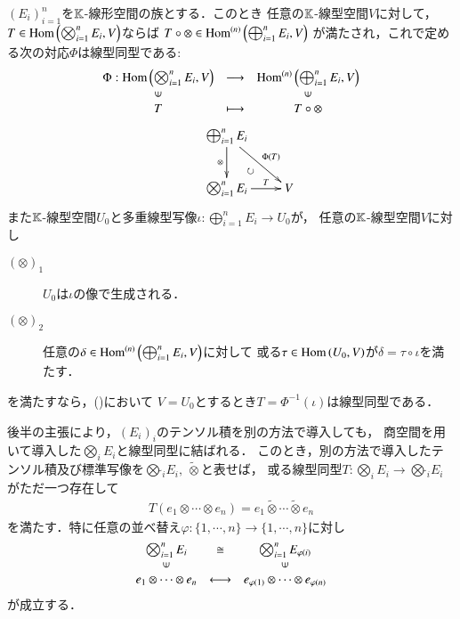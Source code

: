	\begin{screen}
		\begin{thm}
		\label{thm:universality_of_tensor_product}
			$(E_i)_{i=1}^n$を$\K$-線形空間の族とする．このとき
			任意の$\K$-線型空間$V$に対して，$T \in \Hom{\bigotimes_{i=1}^n E_i}{V}$ならば
			$T \circ \otimes \in \Ln{\bigoplus_{i=1}^n E_i}{V}{n}$
			が満たされ，これで定める次の対応$\Phi$は線型同型である:
			\begin{align}
				\begin{array}{ccc}
					\Phi:\Hom{\bigotimes_{i=1}^n E_i}{V} & \longrightarrow & \Ln{\bigoplus_{i=1}^n E_i}{V}{n} \\
					\rotatebox{90}{$\in$} & & \rotatebox{90}{$\in$} \\
					T & \longmapsto & T \circ \otimes 
					\label{eq:thm_universality_of_tensor_product}
				\end{array}
			\end{align}
			\begin{align}
				\xymatrix{
					&\bigoplus_{i=1}^n E_i \ar[d]_-\otimes \ar[rd]^-{\Phi(T)} & \\
					&\bigotimes_{i=1}^n E_i \ar[r]^-T & V \ar@{}[lu]<2ex>|\circlearrowright
				}
			\end{align}
			また$\K$-線型空間$U_0$と多重線型写像$\iota:\bigoplus_{i=1}^n E_i \longrightarrow U_0$が，
			任意の$\K$-線型空間$V$に対し
			\begin{description}
				\item[$(\otimes)_1$] $U_0$は$\iota$の像で生成される．
				\item[$(\otimes)_2$] 任意の$\delta \in \Ln{\bigoplus_{i=1}^n E_i}{V}{n}$に対して
					或る$\tau \in \Hom{U_0}{V}$が$\delta = \tau \circ \iota$を満たす．
			\end{description}
			を満たすなら，()において
			$V = U_0$とするとき$T = \Phi^{-1}(\iota)$は線型同型である．
		\end{thm}
	\end{screen}
	後半の主張により，$(E_i)_i$のテンソル積を別の方法で導入しても，
	商空間を用いて導入した$\bigotimes_i E_i$と線型同型に結ばれる．
	このとき，別の方法で導入したテンソル積及び標準写像を$\bigotimes\tilde{ }_i E_i,\ \tilde{\otimes}$と表せば，
	或る線型同型$T:\bigotimes_i E_i \longrightarrow \bigotimes\tilde{ }_i E_i$がただ一つ存在して
	\begin{align}
		T(e_1 \otimes \cdots \otimes e_n) = e_1 \tilde{\otimes} \cdots \tilde{\otimes} e_n 
	\end{align}
	を満たす．特に任意の並べ替え$\varphi:\{1,\cdots,n\} \longrightarrow \{1,\cdots,n\}$に対し
	\begin{align}
		\begin{array}{ccc}
		\bigotimes_{i=1}^{n} E_i & \cong & \bigotimes_{i=1}^{n} E_{\varphi(i)} \\
		\rotatebox{90}{$\in$} & & \rotatebox{90}{$\in$} \\
		e_1 \otimes \cdots \otimes e_n & \longleftrightarrow & e_{\varphi(1)} \otimes \cdots \otimes e_{\varphi(n)}
		\end{array}
	\end{align}
	が成立する．
	

